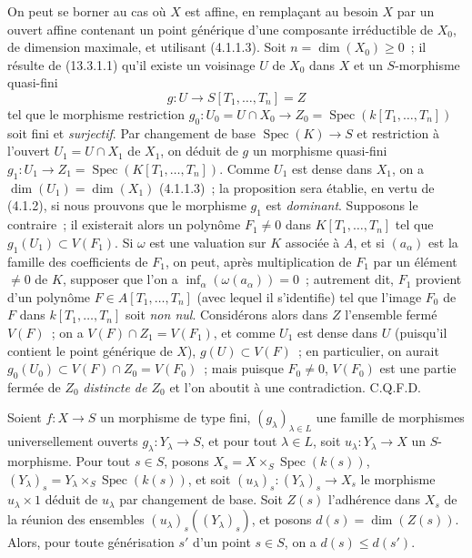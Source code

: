 On peut se borner au cas où $X$ est affine, en remplaçant au besoin $X$ par un
ouvert affine contenant un point générique d'une composante irréductible de $X_0$,
de dimension maximale, et utilisant (4.1.1.3). Soit $n=\dim(X_0)\geq 0$~; il résulte
de (13.3.1.1) qu'il existe un voisinage $U$ de $X_0$ dans $X$ et un $S$-morphisme
quasi-fini
\[
  g:U\to S[T_1,\ldots,T_n]=Z
\]
tel que le morphisme restriction
$g_0:U_0=U\cap X_0\to Z_0=\operatorname{Spec}(k[T_1,\ldots,T_n])$ soit fini et
\emph{surjectif}. Par changement de base $\operatorname{Spec}(K)\to S$ et restriction
à l'ouvert $U_1=U\cap X_1$ de $X_1$, on déduit de $g$ un morphisme quasi-fini
$g_1:U_1\to Z_1=\operatorname{Spec}(K[T_1,\ldots,T_n])$. Comme $U_1$ est dense dans
$X_1$, on a $\dim(U_1)=\dim(X_1)$ (4.1.1.3)~; la proposition sera établie, en vertu
de (4.1.2), si nous prouvons que le morphisme $g_1$ est \emph{dominant}. Supposons
le contraire~; il existerait alors un polynôme $F_1\ne 0$ dans
$K[T_1,\ldots,T_n]$ tel que $g_1(U_1)\subset V(F_1)$. Si $\omega$ est une valuation
sur $K$ associée à $A$, et si $(a_\alpha)$ est la famille des coefficients de $F_1$,
on peut, après multiplication de $F_1$ par un élément $\ne 0$ de $K$, supposer que
l'on a $\inf_\alpha(\omega(a_\alpha))=0$~; autrement dit, $F_1$ provient d'un
polynôme $F\in A[T_1,\ldots,T_n]$ (avec lequel il s'identifie) tel que l'image $F_0$
de $F$ dans $k[T_1,\ldots,T_n]$ soit \emph{non nul}. Considérons alors dans $Z$
l'ensemble fermé $V(F)$~; on a $V(F)\cap Z_1=V(F_1)$, et comme $U_1$ est dense
dans $U$ (puisqu'il contient le point générique de $X$), $g(U)\subset V(F)$~; en
particulier, on aurait $g_0(U_0)\subset V(F)\cap Z_0=V(F_0)$~; mais puisque
$F_0\ne 0$, $V(F_0)$ est une partie fermée de $Z_0$ \emph{distincte de $Z_0$} et
l'on aboutit à une contradiction. C.Q.F.D.


\begin{proposition}[14.3.11]
\label{IV.14.3.11-fr}
Soient $f:X\to S$ un morphisme de type fini, $(g_\lambda)_{\lambda\in L}$ une
famille de morphismes universellement ouverts $g_\lambda:Y_\lambda\to S$, et pour
tout $\lambda\in L$, soit $u_\lambda:Y_\lambda\to X$ un $S$-morphisme. Pour tout
$s\in S$, posons $X_s=X\times_S\operatorname{Spec}(k(s))$,
$(Y_\lambda)_s=Y_\lambda\times_S\operatorname{Spec}(k(s))$, et soit
$(u_\lambda)_s:(Y_\lambda)_s\to X_s$ le morphisme $u_\lambda\times 1$ déduit de
$u_\lambda$ par changement de base. Soit $Z(s)$ l'adhérence dans $X_s$ de la
réunion des ensembles $(u_\lambda)_s((Y_\lambda)_s)$, et posons
$d(s)=\dim(Z(s))$. Alors, pour toute générisation $s'$ d'un point $s\in S$, on a
$d(s)\leq d(s')$.
\end{proposition}

